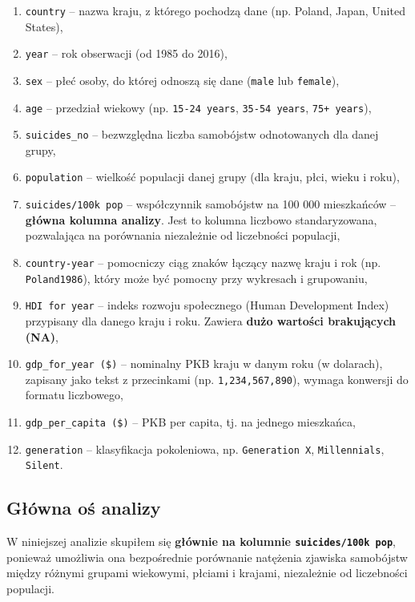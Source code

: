 \documentclass[polish]{article}
\begin{document}
    \begin{enumerate}
        \item \texttt{country} -- nazwa kraju, z którego pochodzą dane (np. Poland, Japan, United States),
        \item \texttt{year} -- rok obserwacji (od 1985 do 2016),
        \item \texttt{sex} -- płeć osoby, do której odnoszą się dane (\texttt{male} lub \texttt{female}),
        \item \texttt{age} -- przedział wiekowy (np. \texttt{15-24 years}, \texttt{35-54 years}, \texttt{75+ years}),
        \item \texttt{suicides\_no} -- bezwzględna liczba samobójstw odnotowanych dla danej grupy,
        \item \texttt{population} -- wielkość populacji danej grupy (dla kraju, płci, wieku i roku),
        \item \texttt{suicides/100k pop} -- współczynnik samobójstw na 100 000 mieszkańców -- \textbf{główna kolumna analizy}. Jest to kolumna liczbowo standaryzowana, pozwalająca na porównania niezależnie od liczebności populacji,
        \item \texttt{country-year} -- pomocniczy ciąg znaków łączący nazwę kraju i rok (np. \texttt{Poland1986}), który może być pomocny przy wykresach i grupowaniu,
        \item \texttt{HDI for year} -- indeks rozwoju społecznego (Human Development Index) przypisany dla danego kraju i roku. Zawiera \textbf{dużo wartości brakujących (NA)},
        \item \texttt{gdp\_for\_year (\$)} -- nominalny PKB kraju w danym roku (w dolarach), zapisany jako tekst z przecinkami (np. \texttt{1,234,567,890}), wymaga konwersji do formatu liczbowego,
        \item \texttt{gdp\_per\_capita (\$)} -- PKB per capita, tj. na jednego mieszkańca,
        \item \texttt{generation} -- klasyfikacja pokoleniowa, np. \texttt{Generation X}, \texttt{Millennials}, \texttt{Silent}.
    \end{enumerate}

    \newpage

    \subsection{Główna oś analizy}

    W niniejszej analizie skupiłem się \textbf{głównie na kolumnie \texttt{suicides/100k pop}}, ponieważ umożliwia ona bezpośrednie porównanie natężenia zjawiska samobójstw między różnymi grupami wiekowymi, płciami i krajami, niezależnie od liczebności populacji.
\end{document}
